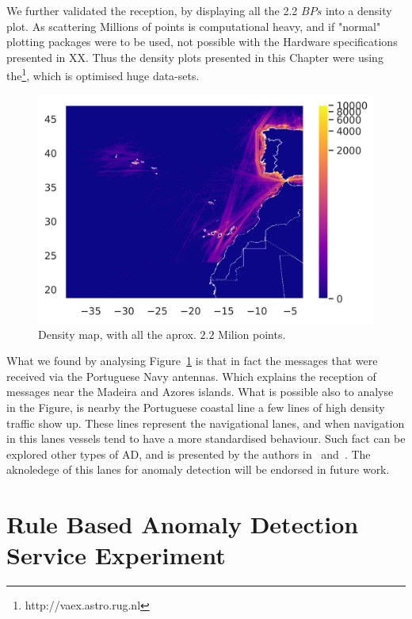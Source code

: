 We further validated the reception, by displaying all the 2.2 $BPs$ into a density plot. As scattering Millions of points is computational heavy, and if "normal" plotting packages were to be used,  not possible with the Hardware specifications presented in XX. Thus the density plots presented in this Chapter were using the\footnote{http://vaex.astro.rug.nl}, which is optimised huge data-sets. 

\begin{figure}[H]
	\centering
	\includegraphics[scale = 1]{figures/Ch5/ThesisExpDensity.png}
    \caption{Density map, with all the aprox. $2.2$ Milion points.}
    \label{fig: 5 Exp1DensityMap}
\end{figure}

What we found by analysing Figure~\ref{fig: 5 Exp1DensityMap} is that in fact the messages that were received via the Portuguese Navy antennas. Which explains the reception of messages near the Madeira and Azores islands.  What is possible also to analyse in the Figure, is nearby the Portuguese coastal line a few lines of high density traffic show up. These lines represent the navigational lanes, and when navigation in this lanes vessels tend to have a more standardised behaviour. Such fact can be explored other types of AD, and is presented by the authors in~\cite{Yan2016} and~\cite{Silveira2013UsePortugal}. The aknoledege of this lanes for anomaly detection will be endorsed in future work.


\section{Rule Based Anomaly Detection Service Experiment}
\label{section: RB-ADS Experiment}

